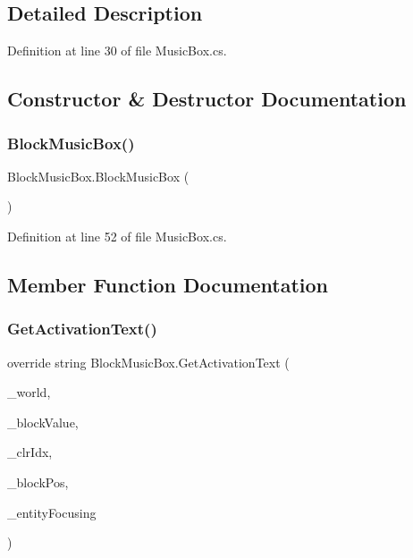 \subsection{Detailed Description}


Definition at line 30 of file Music\+Box.\+cs.



\subsection{Constructor \& Destructor Documentation}
\mbox{\label{class_block_music_box_aa9e724a3213f8d198ceb0516a9c3908c}} 
\subsubsection{\texorpdfstring{BlockMusicBox()}{BlockMusicBox()}}
{\footnotesize\ttfamily Block\+Music\+Box.\+Block\+Music\+Box (\begin{DoxyParamCaption}{ }\end{DoxyParamCaption})}



Definition at line 52 of file Music\+Box.\+cs.



\subsection{Member Function Documentation}
\mbox{\label{class_block_music_box_a294e5968eee60a142c725730257750e3}} 
\subsubsection{\texorpdfstring{GetActivationText()}{GetActivationText()}}
{\footnotesize\ttfamily override string Block\+Music\+Box.\+Get\+Activation\+Text (\begin{DoxyParamCaption}\item[{World\+Base}]{\+\_\+world,  }\item[{Block\+Value}]{\+\_\+block\+Value,  }\item[{int}]{\+\_\+clr\+Idx,  }\item[{Vector3i}]{\+\_\+block\+Pos,  }\item[{Entity\+Alive}]{\+\_\+entity\+Focusing }\end{DoxyParamCaption})}



